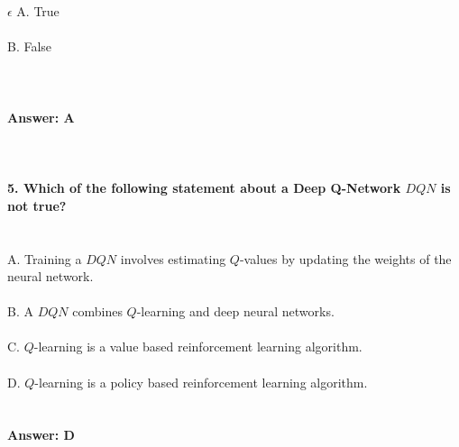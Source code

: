 \documentclass[prl,twocolumn,showpacs,preprintnumbers,superscriptaddress]{revtex4}
\theoremstyle{plain}
\theoremstyle{definition}
\begin{document}
\begin{widetext}
\\
\\ $\epsilon$
A. True
\\
\\
B. False
\\
\\
\\
\\
\textbf{Answer: A}
\\
\\
\\
\\
\textbf{5. Which of the following statement about a Deep Q-Network $DQN$ is not true?}
\\
\\
\\
A. Training a $DQN$ involves estimating $Q$-values by updating the weights of the neural network.
\\
\\
B. A $DQN$ combines $Q$-learning and deep neural networks.
\\
\\
C. $Q$-learning is a value based reinforcement learning algorithm.
\\
\\
D. $Q$-learning is a policy based reinforcement learning algorithm.
\\
\\
\\
\textbf{Answer: D}
\\
\\
\\
\\
\\
\\
\\
\\
\\
\end{widetext}
\end{document}
